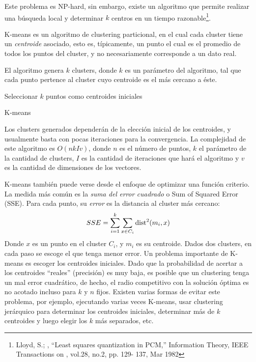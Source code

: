     Este problema es NP-hard, sin embargo, existe un algoritmo que
    permite realizar una búsqueda local y determinar $k$ centros
    en un tiempo razonable\footnote{Lloyd, S.; , ``Least squares quantization in PCM,'' Information Theory, IEEE Transactions on , vol.28, no.2, pp. 129- 137, Mar 1982 }.

    K-means es un algoritmo de clustering particional, en el cual cada
    cluster tiene un \emph{centroide} asociado, esto es, típicamente, un punto
    el cual es el promedio de todos los puntos del cluster, y no
    necesariamente corresponde a un dato real.

    El algoritmo genera $k$ clusters, donde $k$ es un parámetro del
    algoritmo, tal que cada punto pertence al cluster cuyo centroide es el
    más cercano a éste.

\begin{algorithm}[H]
 Seleccionar $k$ puntos como centroides iniciales\;
 \caption{K-means}
\end{algorithm}

    Los clusters generados dependerán de la elección inicial de los
    centroides, y usualmente basta con pocas iteraciones para la
    convergencia. La complejidad de este algoritmo es $O(nkIv)$, donde $n$
    es el número de puntos, $k$ el parámetro de la cantidad de clusters,
    $I$ es la cantidad de iteraciones que hará el algoritmo y $v$ es la
    cantidad de dimensiones de los vectores.

    K-means también puede verse desde el enfoque de optimizar una
    función criterio. La medida más común es la
    \emph{suma del error cuadrado} o Sum of Squared Error (SSE). Para cada
    punto, su \emph{error} es la distancia al cluster más cercano:
    $$SSE = \sum_{i=1}^k\sum_{x\in C_i} \operatorname{dist}^2(m_i,x)$$
    Donde $x$ es un punto en el cluster $C_i$, y $m_i$ es su
    centroide. Dados dos clusters, en cada paso se escoge el que tenga
    menor error.
    Un problema importante de K-means es escoger los centroides
    iniciales. Dado que la probabilidad de acertar a los centroides
    ``reales'' (precisión) es muy baja, es posible que un clustering
    tenga un mal error cuadrático, de hecho, el radio competitivo con
    la solución óptima es no acotado incluso para $k$ y $n$ fijos.
    Existen varias formas de evitar
    este problema, por ejemplo, ejecutando varias veces K-means,
    usar clustering jerárquico para determinar los centroides
    iniciales, determinar más de $k$ centroides y luego elegir los $k$
    más separados, etc.

